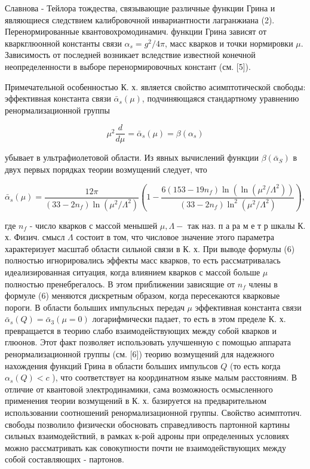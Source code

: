 \documentclass[10pt]{article}
\begin{document}
Славнова - Тейлора тождества, связывающие различные функции Грина и являющиеся следствием калибровочной инвариантности лагранжиана (2). Перенормированные квантовохромодинамич. функции Грина зависят от кваркглюонной константы связи $\alpha_{s}=g^{2} / 4 \pi$, масс кварков и точки нормировки $\mu$. Зависимость от последней возникает вследствие известной конечной неопределенности в выборе перенормировочных констант (см. [5]).



Примечательной особенностью К. х. является свойство асимптотической свободы: эффективная константа связи $\bar{\alpha}_{s}(\mu)$, подчиняющаяся стандартному уравнению ренормализационной группы



\[

\mu^{2} \frac{d}{d \mu}=\bar{\alpha}_{s}(\mu)=\beta\left(\alpha_{s}\right)

\]



убывает в ультрафиолетовой области. Из явных вычислений функции $\beta\left(\bar{\alpha}_{S}\right)$ в двух первых порядках теории возмущений следует, что



\[

\bar{\alpha}_{s}(\mu)=\frac{12 \pi}{\left(33-2 n_{f}\right) \ln \left(\mu^{2} / \Lambda^{2}\right)}\left(1-\frac{6\left(153-19 n_{f}\right) \ln \left(\ln \left(\mu^{2} / \Lambda^{2}\right)\right)}{\left(33-2 n_{f}\right) \ln ^{2}\left(\mu^{2} / \Lambda^{2}\right)}\right),

\]



где $n_{f}$ - число кварков с массой менышей $\mu, \Lambda-$ так наз. п а ра м е т р шкалы К. х. Физич. смысл $\Lambda$ состоит в том, что числовое значение этого параметра характеризует масштаб области сильной связи в К. х. При выводе формулы (6) полностью игнорировались эффекты масс кварков, то есть рассматривалась идеализированная ситуация, когда влиянием кварков с массой больше $\mu$ полностью пренебрегалось. В этом приближении зависящие от $n_{f}$ члены в формуле (6) меняются дискретным образом, когда пересекаются кварковые пороги. В области болыших импульсных передач $\mu$ эффективная константа связи $\bar{\alpha}_{s}(Q)=\bar{\alpha}_{3}(\mu=0)$ логарифмически падает, то есть в этом пределе К. х. превращается в теорию слабо взаимодействующих между собой кварков и глюонов. Этот факт позволяет использовать улучшенную с помощью аппарата ренормализационной группы (см. [6]) теорию возмущений для надежного нахождения функций Грина в области больших импульсов $Q$ (то есть когда $\alpha_{s}(Q)<c$ ), что соответствует на координатном языке малым расстояниям. В отличие от квантовой электродинамики, сама возможность осмысленного применения теории возмущений в К. х. базируется на предварительном использовании соотношений ренормализационной группы. Свойство асимптотич. свободы позволило физически обосновать справедливость партонной картины сильных взаимодействий, в рамках к-рой адроны при определенных условиях можно рассматривать как совокупности почти не взаимодействующих между собой составляющих - партонов.
\end{document}
